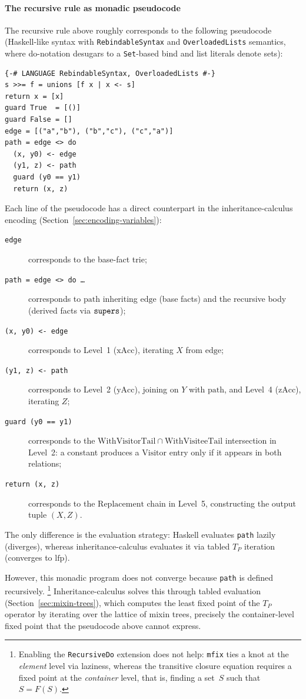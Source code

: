 \paragraph{The recursive rule as monadic pseudocode}
The recursive rule above roughly corresponds to the
following pseudocode (Haskell-like syntax with
  \texttt{RebindableSyntax} and \texttt{OverloadedLists}
  semantics, where do-notation desugars to a
\texttt{Set}-based bind and list literals denote sets):
\begin{lstlisting}[style=haskell]
{-# LANGUAGE RebindableSyntax, OverloadedLists #-}
s >>= f = unions [f x | x <- s]
return x = [x]
guard True  = [()]
guard False = []
edge = [("a","b"), ("b","c"), ("c","a")]
path = edge <> do
  (x, y0) <- edge
  (y1, z) <- path
  guard (y0 == y1)
  return (x, z)
\end{lstlisting}
\noindent
Each line of the pseudocode has a direct counterpart in
the inheritance-calculus encoding
(Section~\ref{sec:encoding-variables}):
\begin{description}
  \item[\texttt{edge}] corresponds to the base-fact trie;
  \item[\texttt{path = edge <> do \ldots}]
    corresponds to $\mathrm{path}$ inheriting $\mathrm{edge}$
    (base facts) and the recursive body (derived facts via
    $\mathtt{supers}$);
  \item[\texttt{(x, y0) <- edge}]
    corresponds to Level~1 ($\mathrm{xAcc}$), iterating $X$
    from $\mathrm{edge}$;
  \item[\texttt{(y1, z) <- path}]
    corresponds to Level~2 ($\mathrm{yAcc}$), joining on $Y$
    with $\mathrm{path}$, and Level~4 ($\mathrm{zAcc}$),
    iterating $Z$;
  \item[\texttt{guard (y0 == y1)}]
    corresponds to the $\mathrm{WithVisitorTail} \cap
    \mathrm{WithVisiteeTail}$ intersection in Level~2: a
    constant produces a $\mathrm{Visitor}$ entry only if it
    appears in both relations;
  \item[\texttt{return (x, z)}]
    corresponds to the $\mathrm{Replacement}$ chain in
    Level~5, constructing the output tuple $(X, Z)$.
\end{description}
The only difference is the evaluation strategy:
Haskell evaluates \texttt{path} lazily (diverges),
whereas inheritance-calculus evaluates it via tabled
$T_P$ iteration (converges to $\mathrm{lfp}$).

However, this monadic program does not converge because
\texttt{path} is defined recursively.%
\footnote{
  Enabling the \texttt{RecursiveDo} extension does not help:
  \texttt{mfix} ties a knot at the \emph{element} level via laziness,
  whereas the transitive closure equation requires a
  fixed point at the \emph{container} level, that is, finding a
  set~$S$ such that $S = F(S)$.
}
Inheritance-calculus solves this through tabled evaluation
(Section~\ref{sec:mixin-trees}), which computes the
least fixed point of the $T_P$ operator by iterating
over the lattice of mixin trees, precisely the
container-level fixed point that the pseudocode above cannot express.

